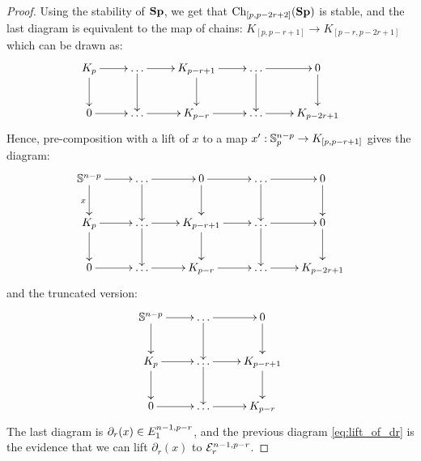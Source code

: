 \begin{proof}
    Using the stability of $\mathbf{Sp}$, we get that $\operatorname{Ch}_{[p,p-2r+2]}(\mathbf{Sp})$ is stable, and the last diagram is equivalent to the map of chains: $K_{[p,p-r+1]} \to K_{[p-r,p-2r+1]}$ which can be drawn as:
    \begin{equation*}
        \xymatrix
        {
            K_p   \ar[r]\ar[d]  & \dots \ar[r]\ar[d]    & K_{p-r+1} \ar[r]\ar[d]    & \dots \ar[r]\ar[d]& 0\ar[d] \\
            0 \ar[r]            & \dots \ar[r]          & K_{p-r} \ar[r]            & \dots \ar[r]       & K_{p-2r+1}
        }
    \end{equation*}
    Hence, pre-composition with a lift of $x$ to a map $x^\prime:\mathbb{S}^{n-p}_p \to K_{[p,p-r+1]}$ gives the diagram:
    \begin{equation}\label{eq:lift_of_dr}
        \xymatrix
        {   \mathbb{S}^{n-p} \ar[r]\ar[d]_x & \dots \ar[r]\ar[d] &  0 \ar[r]\ar[d] & \dots \ar[r]\ar[d] & 0 \ar[d]\\
            K_p \ar[r]\ar[d] & \dots \ar[r]\ar[d] &  K_{p-r+1} \ar[r]\ar[d] & \dots \ar[r]\ar[d] & 0 \ar[d]\\
            0 \ar[r] & \dots \ar[r] & K_{p-r} \ar[r] & \dots \ar[r] & K_{p-2r+1}
        }
    \end{equation}
    and the truncated version:
    \begin{equation*}
        \xymatrix
        {   \mathbb{S}^{n-p} \ar[r]\ar[d] & \dots \ar[r]\ar[d] &  0 \ar[d]\\
            K_p \ar[r]\ar[d] & \dots \ar[r]\ar[d] &  K_{p-r+1} \ar[d] \\
            0 \ar[r] & \dots \ar[r] & K_{p-r}
        }
    \end{equation*}
    The last diagram is $\partial_r(x) \in E_{1}^{n-1,p-r}$, and the previous diagram \cref{eq:lift_of_dr} is the evidence that we can lift $\partial_r(x)$ to $\mathcal{E}_{r}^{n-1,p-r}$.
\end{proof}

\ThB*

